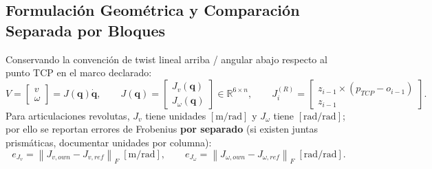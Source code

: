 \documentclass[10pt, a4paper]{article}
\begin{document}
\subsection{Formulación Geométrica y Comparación Separada por Bloques}
Conservando la convención de twist lineal arriba / angular abajo respecto al punto TCP en el marco declarado:
\begin{equation}
    V = \begin{bmatrix} v \\ \omega \end{bmatrix} = J(\mathbf{q})\dot{\mathbf{q}}, \qquad
    J(\mathbf{q}) = \begin{bmatrix} J_v(\mathbf{q}) \\ J_\omega(\mathbf{q}) \end{bmatrix} \in \mathbb{R}^{6 \times n}, \qquad
    J_i^{(R)} = \begin{bmatrix} z_{i-1} \times (p_{TCP} - o_{i-1}) \\ z_{i-1} \end{bmatrix}.
    \label{eq:jac_def}
\end{equation}
Para articulaciones revolutas, $J_v$ tiene unidades $[\mathrm{m/rad}]$ y $J_\omega$ tiene $[\mathrm{rad/rad}]$; por ello se reportan errores de Frobenius \textbf{por separado} (si existen juntas prismáticas, documentar unidades por columna):
\begin{equation}
    \boxed{ e_{J_v} = \left\lVert J_{v,own} - J_{v,ref} \right\rVert_F \; [\mathrm{m/rad}], \qquad
    e_{J_\omega} = \left\lVert J_{\omega,own} - J_{\omega,ref} \right\rVert_F \; [\mathrm{rad/rad}] }.
    \label{eq:jac_err}
\end{equation}
\end{document}
